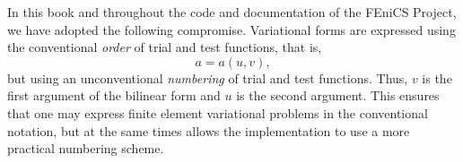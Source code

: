 In this book and throughout the code and documentation of the FEniCS
Project, we have adopted the following compromise. Variational forms
are expressed using the conventional \emph{order} of trial and test
functions, that is,
\begin{equation}
  a = a(u, v),
\end{equation}
but using an unconventional \emph{numbering} of trial and test
functions. Thus, $v$ is the first argument of the bilinear form and
$u$ is the second argument. This ensures that one may express finite
element variational problems in the conventional notation, but at the
same times allows the implementation to use a more practical numbering
scheme.
